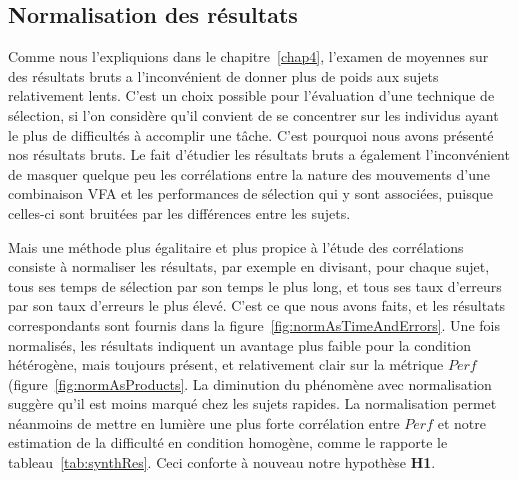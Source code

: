 	\subsection{Normalisation des résultats}
	Comme nous l'expliquions dans le chapitre~\ref{chap4}, l'examen de moyennes sur des résultats bruts a l'inconvénient de donner plus de poids aux sujets relativement lents. C'est un choix possible pour l'évaluation d'une technique de sélection, si l'on considère qu'il convient de se concentrer sur les individus ayant le plus de difficultés à accomplir une tâche. C'est pourquoi nous avons présenté nos résultats bruts. Le fait d'étudier les résultats bruts a également l'inconvénient de masquer quelque peu les corrélations entre la nature des mouvements d'une combinaison VFA et les performances de sélection qui y sont associées, puisque celles-ci sont \og bruitées \fg{} par les différences entre les sujets.
	
	Mais une méthode plus égalitaire et plus propice à l'étude des corrélations consiste à normaliser les résultats, par exemple en divisant, pour chaque sujet, tous ses temps de sélection par son temps le plus long, et tous ses taux d'erreurs par son taux d'erreurs le plus élevé. C'est ce que nous avons faits, et les résultats correspondants sont fournis dans la figure~\ref{fig:normAsTimeAndErrors}. Une fois normalisés, les résultats indiquent un avantage plus faible pour la condition hétérogène, mais toujours présent, et relativement clair sur la métrique $Perf$ (figure~\ref{fig:normAsProducts}. La diminution du phénomène avec normalisation suggère qu'il est moins marqué chez les sujets rapides. La normalisation permet néanmoins de mettre en lumière une plus forte corrélation entre $Perf$ et notre estimation de la difficulté en condition homogène, comme le rapporte le tableau~\ref{tab:synthRes}. Ceci conforte à nouveau notre hypothèse \textbf{H1}.
	

